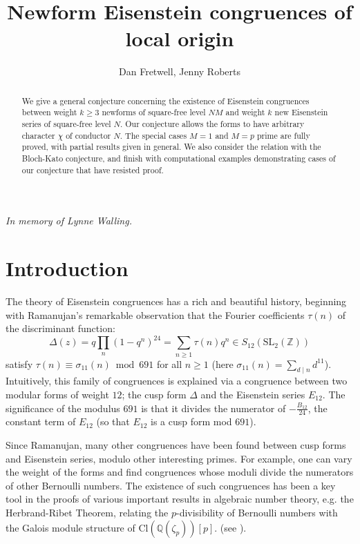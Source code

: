 \documentclass{amsart}
\title{Newform Eisenstein congruences of local origin}
\author{Dan Fretwell, Jenny Roberts}
\date{}
\theoremstyle{plain}
\theoremstyle{definition}
\begin{document}
\maketitle

\begin{center}\textit{In memory of Lynne Walling.}\end{center}

\begin{abstract}
We give a general conjecture concerning the existence of Eisenstein congruences between weight $k\geq 3$ newforms of square-free level $NM$ and weight $k$ new Eisenstein series of square-free level $N$. Our conjecture allows the forms to have arbitrary character $\chi$ of conductor $N$. The special cases $M=1$ and $M=p$ prime are fully proved, with partial results given in general. We also consider the relation with the Bloch-Kato conjecture, and finish with computational examples demonstrating cases of our conjecture that have resisted proof.
\end{abstract}

\section{Introduction}

The theory of Eisenstein congruences has a rich and beautiful history, beginning with Ramanujan's remarkable observation that the Fourier coefficients $\tau(n)$ of the discriminant function: \[\Delta(z) = q\prod_n(1-q^n)^{24} = \sum_{n\geq 1}\tau(n)q^n \in S_{12}(\text{SL}_2(\mathbb{Z}))\] satisfy $\tau(n)\equiv \sigma_{11}(n) \bmod 691$ for all $n\geq 1$ (here $\sigma_{11}(n) = \sum_{d\mid n}d^{11}$). Intuitively, this family of congruences is explained via a congruence between two modular forms of weight $12$; the cusp form $\Delta$ and the Eisenstein series $E_{12}$. The significance of the modulus $691$ is that it divides the numerator of $-\frac{B_{12}}{24}$, the constant term of $E_{12}$ (so that $E_{12}$ is a cusp form mod $691$).

Since Ramanujan, many other congruences have been found between cusp forms and Eisenstein series, modulo other interesting primes. For example, one can vary the weight of the forms and find congruences whose moduli divide the numerators of other Bernoulli numbers. The existence of such congruences has been a key tool in the proofs of various important results in algebraic number theory, e.g. the Herbrand-Ribet Theorem, relating the $p$-divisibility of Bernoulli numbers with the Galois module structure of $\text{Cl}(\mathbb{Q}(\zeta_p))[p]$. (see \cite{ribet_1976}).
\end{document}
